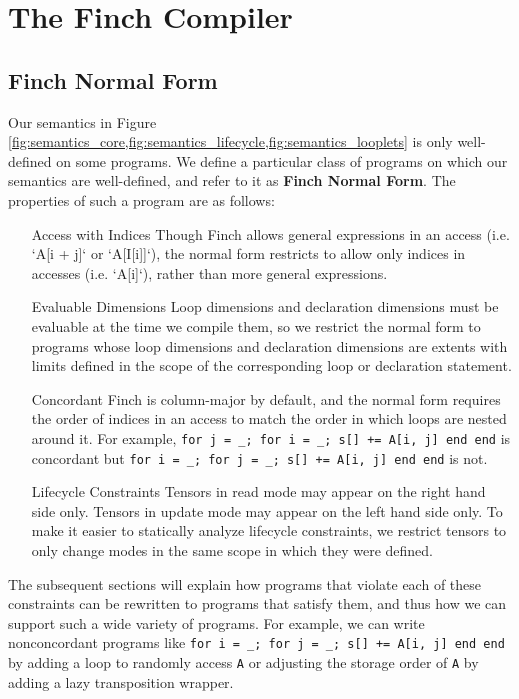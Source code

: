 \section{The Finch Compiler}

\subsection{Finch Normal Form}

Our semantics in Figure
\ref{fig:semantics_core,fig:semantics_lifecycle,fig:semantics_looplets} is only
well-defined on some programs. We define a particular class of programs on which
our semantics are well-defined, and refer to it as \textbf{Finch Normal Form}.
The properties of such a program are as follows:
\begin{enumerate}
    \item[Access with Indices] Though Finch allows general expressions in an
    access (i.e. `A[i + j]` or `A[I[i]]`), the normal form restricts to allow only indices in 
    accesses (i.e. `A[i]`), rather than more general expressions.
    \item[Evaluable Dimensions] Loop dimensions and declaration dimensions must
    be evaluable at the time we compile them, so we restrict the normal form to
    programs whose loop dimensions and declaration dimensions are extents with
    limits defined in the scope of the corresponding loop or declaration
    statement.
    \item[Concordant] Finch is column-major by default, and the normal form
    requires the order of indices in an access to match the order in which loops
    are nested around it.  For example,
    \texttt{for j = _; for i = _; s[] += A[i, j] end end}
    is concordant but
    \texttt{for i = _; for j = _; s[] += A[i, j] end end} is not.
    \item[Lifecycle Constraints] Tensors in read mode may appear on the right
    hand side only. Tensors in update mode may appear on the left hand side
    only. To make it easier to statically analyze lifecycle constraints, we
    restrict tensors to only change modes in the same scope in which they were
    defined.
\end{enumerate}

The subsequent sections will explain how programs that violate each of these
constraints can be rewritten to programs that satisfy them, and thus how we can
support such a wide variety of programs. For example, we can write nonconcordant
programs like  \texttt{for i = _; for j = _; s[] += A[i, j] end end}
by adding a loop to randomly access \texttt{A} or adjusting the
storage order of \texttt{A} by adding a lazy transposition wrapper.

